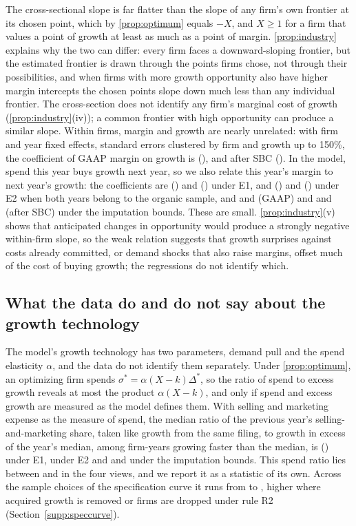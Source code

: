 The cross-sectional slope is far flatter than the slope of any firm's own frontier at its chosen point, which by \autoref{prop:optimum} equals $-X$, and $X\geq1$ for a firm that values a point of growth at least as much as a point of margin. \autoref{prop:industry} explains why the two can differ: every firm faces a downward-sloping frontier, but the estimated frontier is drawn through the points firms chose, not through their possibilities, and when firms with more growth opportunity also have higher margin intercepts the chosen points slope down much less than any individual frontier. The cross-section does not identify any firm's marginal cost of growth (\autoref{prop:industry}(iv)); a common frontier with high opportunity can produce a similar slope. Within firms, margin and growth are nearly unrelated: with firm and year fixed effects, standard errors clustered by firm and growth up to 150\%, the coefficient of GAAP margin on growth is \WfOpNow{} (\WfOpNowSe), and after SBC \WfCashNow{} (\WfCashNowSe). In the model, spend this year buys growth next year, so we also relate this year's margin to next year's growth: the coefficients are \WfOpLead{} (\WfOpLeadSe) and \WfCashLead{} (\WfCashLeadSe) under E1, and \WfEtwoOpLead{} (\WfEtwoOpLeadSe) and \WfEtwoCashLead{} (\WfEtwoCashLeadSe) under E2 when both years belong to the organic sample, and \WfImpFourOpLeadSame{} and \WfImpEightOpLeadSame{} (GAAP) and \WfImpFourCashLeadSame{} and \WfImpEightCashLeadSame{} (after SBC) under the imputation bounds. These are small. \autoref{prop:industry}(v) shows that anticipated changes in opportunity would produce a strongly negative within-firm slope, so the weak relation suggests that growth surprises against costs already committed, or demand shocks that also raise margins, offset much of the cost of buying growth; the regressions do not identify which.

\subsection{What the data do and do not say about the growth technology}
The model's growth technology has two parameters, demand pull and the spend elasticity $\alpha$, and the data do not identify them separately. Under \autoref{prop:optimum}, an optimizing firm spends $\sigma^*=\alpha(X-k)\Delta^*$, so the ratio of spend to excess growth reveals at most the product $\alpha(X-k)$, and only if spend and excess growth are measured as the model defines them. With selling and marketing expense as the measure of spend, the median ratio of the previous year's selling-and-marketing share, taken like growth from the same filing, to growth in excess of the year's median, among firm-years growing faster than the median, is \SpendEone{} (\SpendEoneSe) under E1, \SpendEtwo{} under E2 and \SpendImpFour{} and \SpendImpEight{} under the imputation bounds. This spend ratio lies between \SpendLo{} and \SpendHi{} in the four views, and we report it as a statistic of its own. Across the sample choices of the specification curve it runs from \ScSpendMin{} to \ScSpendMax, higher where acquired growth is removed or firms are dropped under rule R2 (Section~\ref{supp:speccurve}).

